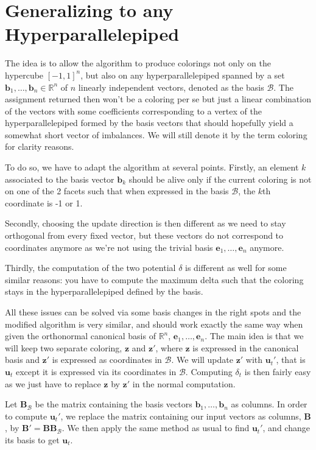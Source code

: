 \documentclass[12pt]{article}
\begin{document}
\section{Generalizing to any Hyperparallelepiped}\label{different_basis_section}
The idea is to allow the algorithm to produce colorings not only on the hypercube $[-1,1]^n$, but also on any hyperparallelepiped spanned by a set $\textbf{b}_1,\dots, \textbf{b}_n\in\mathbb{R}^n$ of $n$ linearly independent vectors, denoted as the basis $\mathcal{B}$. The assignment returned then won't be a coloring per se but just a linear combination of the vectors with some coefficients corresponding to a vertex of the hyperparallelepiped formed by the basis vectors that should hopefully yield a somewhat short vector of imbalances. We will still denote it by the term coloring for clarity reasons.

To do so, we have to adapt the algorithm at several points. Firstly, an element $k$ associated to the basis vector $\textbf{b}_k$ should be alive only if the current coloring is not on one of the 2 facets such that when expressed in the basis $\mathcal{B}$, the $k$th coordinate is -1 or 1. 

Secondly, choosing the update direction is then different as we need to stay orthogonal from every fixed vector, but these vectors do not correspond to coordinates anymore as we're not using the trivial basis $\textbf{e}_1,\dots,\textbf{e}_n$ anymore.

Thirdly, the computation of the two potential $\delta$ is different as well for some similar reasons: you have to compute the maximum delta such that the coloring stays in the hyperparallelepiped defined by the basis.

All these issues can be solved via some basis changes in the right spots and the modified algorithm is very similar, and should work exactly the same way when given the orthonormal canonical basis of $\mathbb{R}^n$, $\textbf{e}_1,\dots,\textbf{e}_n$. The main idea is that we will keep two separate coloring, $\textbf{z}$ and $\textbf{z}'$, where $\textbf{z}$ is expressed in the canonical basis and $\textbf{z}'$ is expressed as coordinates in $\mathcal{B}$. We will update $\textbf{z}'$ with $\textbf{u}_t'$, that is $\textbf{u}_t$ except it is expressed via its coordinates in $\mathcal{B}$. Computing $\delta_t$ is then fairly easy as we just have to replace $\textbf{z}$ by $\textbf{z}'$ in the normal computation. 

Let $\textbf{B}_{\mathcal{B}}$ be the matrix containing the basis vectors $\textbf{b}_1,\dots,\textbf{b}_n$ as columns. In order to compute $\textbf{u}_t'$, we replace the matrix containing our input vectors as columns, $\textbf{B}$, by $\textbf{B}'=\textbf{B}\textbf{B}_{\mathcal{B}}$. We then apply the same method as usual to find $\textbf{u}_t'$, and change its basis to get $\textbf{u}_t$.
\end{document}
